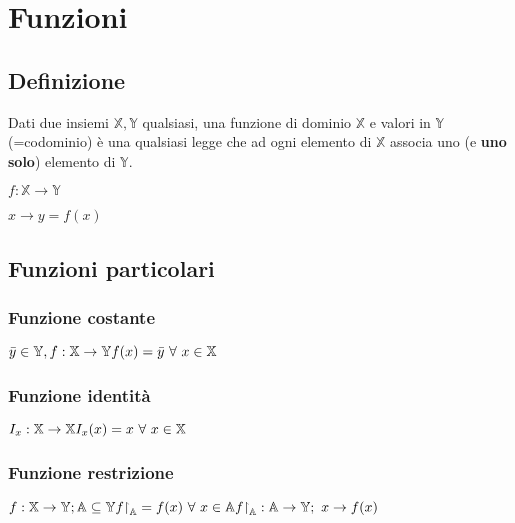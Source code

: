 \chapter{Funzioni}
\section{Definizione}
Dati due insiemi $\mathbb{X},\mathbb{Y}$ qualsiasi, una funzione di dominio $\mathbb{X}$ e valori in $\mathbb{Y}$ (=codominio) è una qualsiasi legge che ad ogni elemento di $\mathbb{X}$ associa uno (e \textbf{uno solo}) elemento di $\mathbb{Y}$.
\begin{center}
	\begin{LARGE}
		$f: \mathbb{X} \rightarrow \mathbb{Y}$\\
	\end{LARGE}
	$x \rightarrow y=f(x)$
\end{center}

\section{Funzioni particolari}
\subsection{Funzione costante}
\begin{Large}
$\bar{y} \in \mathbb{Y}, f: \mathbb{X} \rightarrow \mathbb{Y}\\
f(x)=\bar{y}\ \forall\ x \in \mathbb{X}$
\end{Large}
\subsection{Funzione identità}
\begin{Large}
$I_x: \mathbb{X} \rightarrow \mathbb{X}\\
I_x(x)=x\ \forall\ x \in \mathbb{X}$
\end{Large}
\subsection{Funzione restrizione}
\begin{Large}
$f: \mathbb{X} \rightarrow \mathbb{Y}; \mathbb{A} \subseteq \mathbb{Y}\\
f\restriction_\mathbb{A} =f(x)\ \forall\ x \in \mathbb{A}\\
f\restriction_\mathbb{A}: \mathbb{A} \rightarrow \mathbb{Y};\ x \rightarrow f(x)$
\end{Large}

